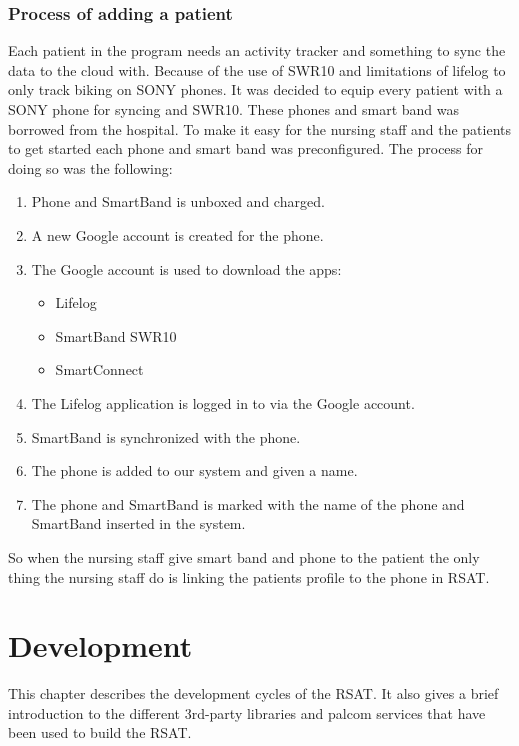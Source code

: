 \documentclass{cslthse-msc}
\begin{document}
\subsection{Process of adding a patient}

Each patient in the program needs an activity tracker and something to sync the data to the cloud with. Because of the use of SWR10 and limitations of lifelog to only track biking on SONY phones. It was decided to equip every patient with a SONY phone for syncing and SWR10. These phones and smart band was borrowed from the hospital. To make it easy for the nursing staff and the patients to get started each phone and smart band was preconfigured. The process for doing so was the following:

\begin{enumerate}
    \item{Phone and SmartBand is unboxed and charged.}
    \item{A new Google account is created for the phone.}
    \item{The Google account is used to download the apps:
\begin{itemize}
    \item Lifelog
    \item SmartBand SWR10
    \item SmartConnect 
\end{itemize}}
    \item{The Lifelog application is logged in to via the Google account.}
    \item{SmartBand is synchronized with the phone.}
    \item{The phone is added to our system and given a name.}
    \item{The phone and SmartBand is marked with the name of the phone and SmartBand inserted in the system.}
\end{enumerate}

So when the nursing staff give smart band and phone to the patient the only thing the nursing staff do is linking the patients profile to the phone in RSAT. %


\chapter{Development}
This chapter describes the development cycles of the RSAT. It also gives a brief introduction to the different 3rd-party libraries and palcom services that have been used to build the RSAT.
\end{document}
